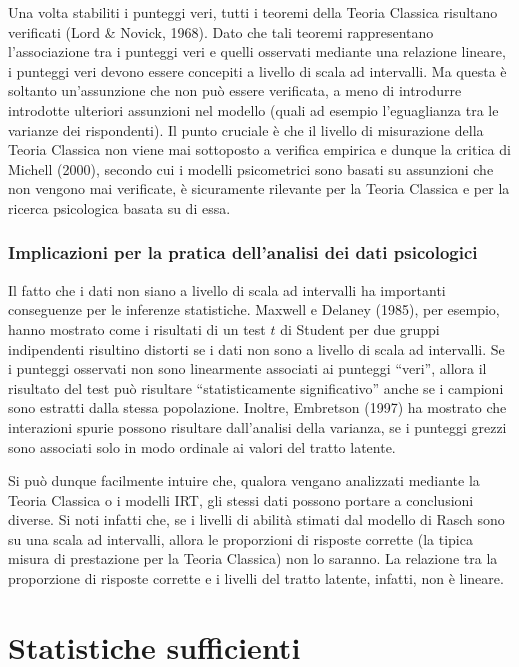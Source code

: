 Una volta stabiliti i punteggi veri, tutti i teoremi della Teoria Classica risultano verificati (Lord \& Novick, 1968). Dato che tali teoremi rappresentano l'associazione tra i punteggi veri e quelli osservati mediante una relazione lineare, i punteggi veri devono essere concepiti a livello di scala ad intervalli.  Ma questa è soltanto un'assunzione che non può essere verificata, a meno di introdurre introdotte ulteriori assunzioni nel modello (quali ad esempio l'eguaglianza tra le varianze dei rispondenti). Il punto cruciale è che il livello di misurazione della Teoria Classica non viene mai sottoposto a verifica empirica e dunque la critica di Michell (2000), secondo cui  i modelli psicometrici sono basati su assunzioni che non vengono mai verificate, è sicuramente rilevante per la Teoria Classica e per la ricerca psicologica basata su di essa. 

\subsubsection{Implicazioni per la pratica dell'analisi dei dati psicologici}

Il fatto che i dati non siano a livello di scala ad intervalli ha importanti conseguenze per le inferenze statistiche. Maxwell e Delaney (1985), per esempio, hanno mostrato come i risultati di un test $t$ di Student per due gruppi indipendenti risultino distorti se i dati non sono a livello di scala ad intervalli.  Se i punteggi osservati non sono linearmente associati ai punteggi ``veri'', allora il risultato del test può risultare ``statisticamente significativo'' anche se i campioni sono estratti dalla stessa popolazione. Inoltre, Embretson (1997) ha mostrato che interazioni spurie possono risultare dall'analisi della varianza, se i punteggi grezzi sono associati solo in modo ordinale ai valori del tratto latente. 

Si può dunque facilmente intuire che, qualora vengano analizzati mediante la Teoria Classica o i modelli IRT, gli stessi dati possono portare a conclusioni diverse. Si noti infatti che, se i livelli di abilità stimati dal modello di Rasch sono su una scala ad intervalli, allora le proporzioni di risposte corrette (la tipica misura di prestazione per la Teoria Classica) non lo saranno. La relazione tra la proporzione di risposte corrette e i livelli del tratto latente, infatti, non è lineare. 


\section{Statistiche sufficienti}

